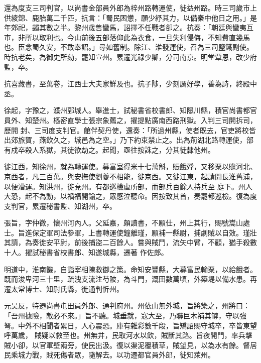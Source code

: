 \begin{pinyinscope}
 還為度支三司判官，以尚書金部員外郎為梓州路轉運使，徙益州路。時三司歲市上供綾錦、鹿胎萬二千匹，抗言：「蜀民困憊，願少紓其力，以備秦中他日之用。」是年郊祀，蠲其數之半。黎州歲售蠻馬，詔擇不任戰者卻之。抗奏：「朝廷與蠻夷互市，非所以取利也。今山前後五部落仰此為衣食，一旦失利侵侮，不知費直幾馬
 也。臣念蜀久安，不敢奉詔。」尋如舊制。除江、淮發運使，召為三司鹽鐵副使。時抗老矣，為御史所劾，罷知宣州。累遷光祿少卿，分司南京。明堂覃恩，改少府監，卒。



 抗喜藏書，至萬卷，江西士大夫家鮮及也。抗子陟，少刻厲好學，善為詩，終殿中丞。



 徐起，字豫之，濮州鄄城人。舉進士，試秘書省校書郎、知隰川縣，積官尚書都官員外、知楚州。樞密直學士張宗象薦之，擢提點廣南西路刑獄。入判三司開拆司，歷開
 封、三司度支判官。館伴契丹使，還奏：「所過州縣，使者既去，官吏將校皆出郊旅賀，燕飲久之，城邑為之空。」乃下約束禁止之。出為荊湖北路轉運使，部有戍卒殺人系獄，其徒欲劫之。起聞，亟往按誅之，分其徒隸他州。



 徙江西，知徐州，就為轉運使。募富室得米十七萬斛，賑餓殍，又移粟以贍河北、京西者，凡三百萬。與安撫使劉夔不相能，徙京西。又徙江東，起請開長淮舊浦，以便漕運。知洪州，徙兗州。有都巡檢虐所部，而部兵百餘人持兵至
 庭下。州人大恐，起不為動，以禍福開諭之，眾感泣聽命。因按致其首，奏罷都巡檢。復為度支判官，累遷秘書監、知湖州，卒。



 張旨，字仲微，懷州河內人。父延嘉，頗讀書，不願仕，州上其行，賜號嵩山處士。旨進保定軍司法參軍，上書轉運使鐘離瑾，願補一縣尉，捕劇賊以自效。瑾壯其請，為奏徙安平尉，前後捕盜二百餘人。嘗與賊鬥，流矢中臂，不顧，猶手殺數十人。擢試秘書省校書郎、知遂城縣，遷著
 作佐郎。



 明道中，淮南饑，自詣宰相陳救御之策。命知安豐縣，大募富民輸粟，以給餓者。既而浚卑河三十里，疏洩支流注芍陂，為斗門，溉田數萬頃，外築堤以備水患。再遷太常博士、知尉氏縣，徙通判忻州。



 元昊反，特遷尚書屯田員外郎、通判府州。州依山無外城，旨將築之，州將曰：「吾州據險，敵必不來。」旨不聽。城垂就，寇大至，乃聯巨木補其罅，守以強弩。中外不相聞者累日，人心震恐。庫有雜彩數千段，旨矯詔賜守城卒，卒皆東望呼萬歲，
 賊疑以救至也。州無井，民取河水以飲，賊斷其路。旨夜開門，率兵擊賊小卻，以官軍壁兩旁，使民出汲。復以渠泥覆積草，賊望見，以為水有餘。督居民乘城力戰，賊死傷者眾，隨解去。以功遷都官員外郎，徙知萊州。




\end{pinyinscope}
